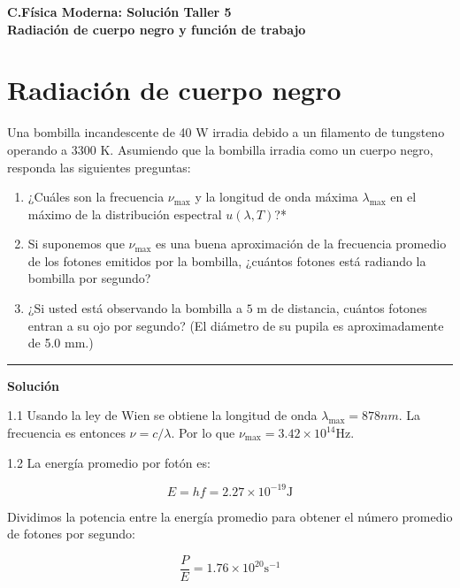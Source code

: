 \documentclass[12pt]{article}
\begin{document}
 
\begin{center}
\Large \textbf{C.Física Moderna: Solución Taller 5}\\
\normalsize \textbf{Radiación de cuerpo negro y función de trabajo}
\end{center}
 
  

\section{Radiación de cuerpo negro}


Una bombilla incandescente de 40 W irradia debido a un filamento de tungsteno operando
a 3300 K. Asumiendo que la bombilla irradia como un cuerpo negro, responda las siguientes preguntas:
\begin{enumerate}
	\item  ¿Cuáles son la frecuencia $\nu_{\text{max}}$  y la longitud de onda máxima $\lambda_{\text{max}}$  en el máximo de la distribución espectral $u(\lambda,T)$?*
	\item  Si suponemos que $\nu_{\text{max}}$ es una buena aproximación de la frecuencia promedio de los fotones
	emitidos por la bombilla, ¿cuántos fotones está radiando la bombilla por segundo?
	\item  ¿Si usted está observando la bombilla a $5$ m de distancia, cuántos fotones entran a su ojo
	por segundo? (El diámetro de su pupila es aproximadamente de 5.0 mm.)
\end{enumerate}


\noindent\rule{16.5cm}{0.4pt}


\begin{center}
	\textbf{Solución}
\end{center}


1.1 Usando la ley de Wien se obtiene la longitud de onda $\lambda_{\text{max}} = 878 nm$. La frecuencia es entonces $\nu = c/\lambda$. Por lo que  $\nu_{\text{max}} = 3.42 \times 10^{14}\text{Hz}$.

1.2 La energía promedio por fotón es:

\begin{equation*}
E =  h f = 2.27 \times 10^{-19} \text{J}
\end{equation*}

Dividimos la potencia entre la energía promedio para obtener el número promedio de fotones por segundo:

\begin{equation*}
\frac{P}{E} = 1.76 \times 10^{20} \text{s}^{-1}
\end{equation*}
\end{document}
